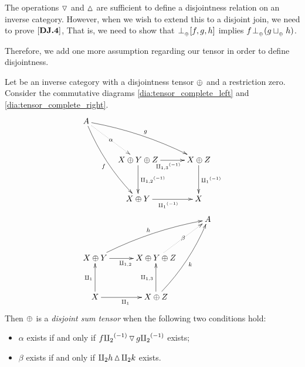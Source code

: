 The operations $\operatorname{\triangledown}$ and $\operatorname{\vartriangle}$ are sufficient to define a disjointness relation
on an inverse category. However, when we wish to extend this to a disjoint join, we need to prove
$[\text{\bfseries {DJ}.{4}}]$, That is, we need to show that ${}_{{}_{}}{\perp_{{}_{\oplus}}} [f,g,h]$ implies $f {}_{{}_{}}{\perp_{{}_{\oplus}}} (g \sqcup_{{_{\oplus}}} h)$.

Therefore, we add one more assumption regarding our tensor in order to define disjointness.

\begin{definition}\label{def:disjoint_sum_tensor}
  Let \X be an inverse category with a disjointness tensor $\oplus$ and a restriction zero. Consider the
  commutative diagrams \ref{dia:tensor_complete_left} and \ref{dia:tensor_complete_right}.
  \begin{align}
    &\xymatrix@C+5pt@R+10pt{
      A \ar@/_/[ddr]_f \ar@/^/[drr]^g \ar@{.>}[dr]|-{\alpha} \\
        & X\+Y\+Z \ar[d]^{\icp{1,2}} \ar[r]_{\icp{1,3}} & X\+Z \ar[d]^{\icpa} \\
        & X\+Y \ar[r]_{\icpa} & X
    } \label{dia:tensor_complete_left}\\
    &\xymatrix@C+5pt@R+10pt{
        &&A \\
         X\+Y \ar[r]_{\cp{1,2}} \ar@/^/[urr]^h &X\+Y\+Z \ar@{.>}[ur]|-{\beta} \\
         X \ar[u]^{\cpa} \ar[r]_{\cpa} & X\+Z \ar[u]^{\cp{1,3}} \ar@/_/[uur]_k
    } \label{dia:tensor_complete_right}
  \end{align}
  Then
  $\oplus$ is a \emph{disjoint sum tensor} when the following two conditions hold:
  \begin{itemize}
    \item $\alpha$ exists if and only if  $f {\amalg_{2}}^{(-1)} \operatorname{\triangledown} g {\amalg_{2}}^{(-1)}$ exists;
    \item $\beta$ exists if and only if $\amalg_{2} h \operatorname{\vartriangle} \amalg_{2} k$ exists.
  \end{itemize}

\end{definition}

